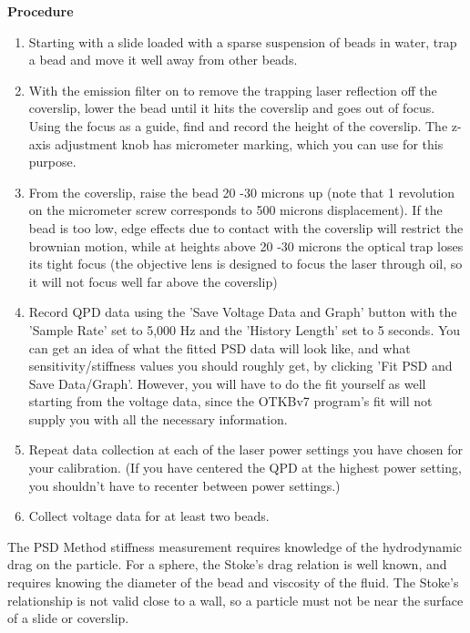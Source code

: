\documentclass{../lab}
\begin{document}
\textbf{Procedure}

\begin{enumerate}
    \item Starting with a slide loaded with a sparse suspension of beads in water, trap a bead and move it well away from other beads.

    \item With the emission filter on to remove the trapping laser reflection off the coverslip, lower the bead until it hits the coverslip and goes out of focus. Using the focus as a guide, find and record the height of the coverslip. The z-axis adjustment knob has micrometer marking, which you can use for this purpose.

    \item From the coverslip, raise the bead 20 -30  microns up (note that 1 revolution on the micrometer screw corresponds to 500 microns displacement). If the bead is too low, edge effects due to contact with the coverslip will restrict the brownian motion, while at heights above 20 -30 microns the optical trap loses its tight focus (the objective lens is designed to focus the laser through oil, so it will not focus well far above the coverslip)

    \item Record QPD data using the 'Save Voltage Data and Graph' button with the 'Sample Rate' set to 5,000 Hz and the 'History Length' set to 5 seconds. You can get an idea of what the fitted PSD data will look like, and what sensitivity/stiffness values you should roughly get, by clicking 'Fit PSD and Save Data/Graph'. However, you will have to do the fit yourself as well starting from the voltage data, since the OTKBv7 program's fit will not supply you with all the necessary information.

    \item Repeat data collection at each of the laser power settings you have chosen for your calibration. (If you have centered the QPD at the highest power setting, you shouldn't have to recenter between power settings.)

    \item Collect voltage data for at least two beads.

\end{enumerate}

The PSD Method stiffness measurement requires knowledge of the hydrodynamic drag on the particle. For a sphere, the Stoke's drag relation is well known, and requires knowing the diameter of the bead and viscosity of the fluid. The Stoke's relationship is not valid close to a wall, so a particle must not be near the surface of a slide or coverslip.
\end{document}
